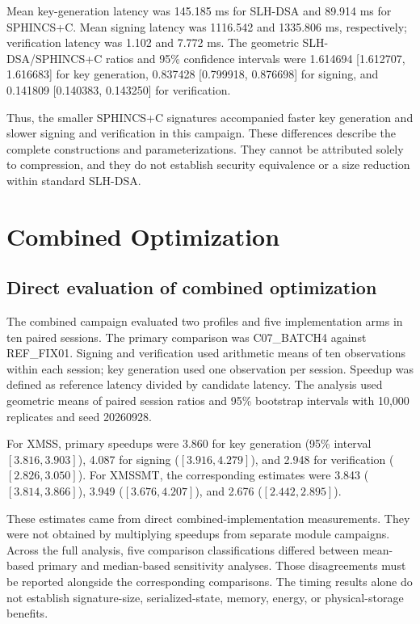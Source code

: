 \documentclass[pdflatex,sn-mathphys-num]{sn-jnl}
\begin{document}
Mean key-generation latency was 145.185 ms for SLH-DSA and
89.914 ms for SPHINCS+C. Mean signing latency was 1116.542
and 1335.806 ms, respectively; verification latency was
1.102 and 7.772 ms. The geometric SLH-DSA/SPHINCS+C ratios
and 95\% confidence intervals were 1.614694
[1.612707, 1.616683] for key generation, 0.837428
[0.799918, 0.876698] for signing, and 0.141809
[0.140383, 0.143250] for verification.

Thus, the smaller SPHINCS+C signatures accompanied faster
key generation and slower signing and verification in this
campaign. These differences describe the complete constructions
and parameterizations. They cannot be attributed solely to
compression, and they do not establish security equivalence
or a size reduction within standard SLH-DSA.





\section{Combined Optimization}
\label{sec:combined}

\subsection{Direct evaluation of combined optimization}
\label{subsec:o9_combined_review}

The combined campaign evaluated two profiles and five implementation
arms in ten paired sessions. The primary comparison was C07\_BATCH4
against REF\_FIX01. Signing and verification used arithmetic means of
ten observations within each session; key generation used one
observation per session. Speedup was defined as reference latency
divided by candidate latency. The analysis used geometric means of
paired session ratios and 95\% bootstrap intervals with 10,000
replicates and seed 20260928.

For XMSS, primary speedups were 3.860 for key generation
(95\% interval $[3.816,3.903]$), 4.087 for signing
($[3.916,4.279]$), and 2.948 for verification
($[2.826,3.050]$). For XMSSMT, the corresponding estimates were
3.843 ($[3.814,3.866]$), 3.949 ($[3.676,4.207]$), and
2.676 ($[2.442,2.895]$).

These estimates came from direct combined-implementation measurements.
They were not obtained by multiplying speedups from separate module
campaigns. Across the full analysis, five comparison classifications
differed between mean-based primary and median-based sensitivity
analyses. Those disagreements must be reported alongside the
corresponding comparisons. The timing results alone do not establish
signature-size, serialized-state, memory, energy, or physical-storage
benefits.
\end{document}
